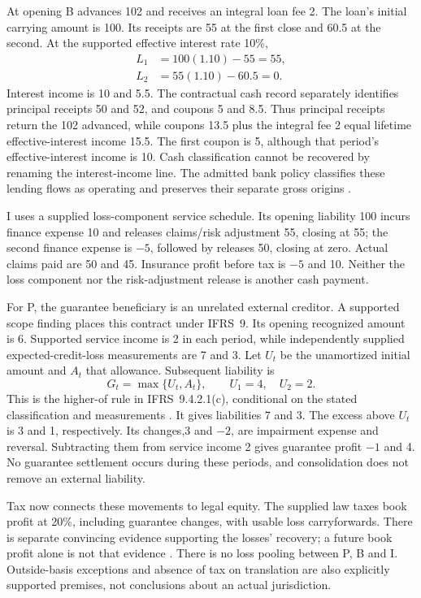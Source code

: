 At opening B advances 102 and receives an integral loan fee 2. The loan's initial
carrying amount is 100. Its receipts are 55 at the first close and 60.5 at the
second. At the supported effective interest rate 10\%,
\begin{align}
 L_1&=100(1.10)-55=55,\\
 L_2&=55(1.10)-60.5=0.
\end{align}
Interest income is 10 and 5.5. The contractual cash record separately identifies
principal receipts 50 and 52, and coupons 5 and 8.5. Thus principal receipts return
the 102 advanced, while coupons 13.5 plus the integral fee 2 equal lifetime
effective-interest income 15.5. The first coupon is 5, although that period's
effective-interest income is 10. Cash classification cannot be recovered by
renaming the interest-income line. The admitted bank policy classifies these
lending flows as operating and preserves their separate gross origins
\citep[IAS~7.14--15,31--33; IFRS~9.B 5.4.1--B 5.4.4]{eu20231803}.

I uses a supplied loss-component service schedule. Its opening
liability 100 incurs finance expense 10 and releases claims/risk adjustment 55,
closing at 55; the second finance expense is \(-5\), followed by releases 50,
closing at zero. Actual claims paid are 50 and 45. Insurance profit before tax
is \(-5\) and 10. Neither the loss component nor the risk-adjustment release is
another cash payment.

For P, the guarantee beneficiary is an unrelated external creditor. A supported
scope finding places this contract under IFRS~9. Its opening recognized amount
is 6. Supported service income is 2 in each period, while independently supplied
expected-credit-loss measurements are 7 and 3. Let \(U_t\) be the unamortized
initial amount and \(A_t\) that allowance. Subsequent liability is
\begin{equation}
 G_t=\max\{U_t,A_t\},\qquad U_1=4,\quad U_2=2.
 \label{eq:sector-guarantee-higher-of}
\end{equation}
This is the higher-of rule in IFRS~9.4.2.1(c), conditional on the stated
classification and measurements \citep{eu20231803}. It gives liabilities 7
and 3. The excess above \(U_t\) is 3 and 1, respectively. Its changes,3 and
\(-2\), are impairment expense and reversal. Subtracting them from service
income 2 gives guarantee profit \(-1\) and 4. No guarantee settlement occurs
during these periods, and consolidation does not remove an external liability.

Tax now connects these movements to legal equity. The supplied law taxes book
profit at 20\%, including guarantee changes, with usable loss carryforwards.
There is separate convincing evidence supporting the losses' recovery; a
future book profit alone is not that evidence
\citep[IAS~12.34--36,46--47]{eu20231803}. There is no loss pooling between P,
B and I. Outside-basis exceptions and absence of tax on translation are also
explicitly supported premises, not conclusions about an actual jurisdiction.

